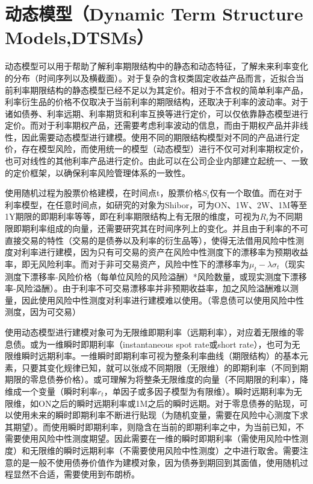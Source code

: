 \documentclass[11pt]{article}
\begin{document}
\section{动态模型（Dynamic Term Structure Models,DTSMs）}

动态模型可以用于帮助了解利率期限结构中的静态和动态特征，了解未来利率变化的分布（时间序列以及横截面）。对于复杂的含权类固定收益产品而言，近拟合当前利率期限结构的静态模型已经不足以为其定价。相对于不含权的简单利率产品，利率衍生品的价格不仅取决于当前利率的期限结构，还取决于利率的波动率。对于诸如债券、利率远期、利率期货和利率互换等进行定价，可以仅依靠静态模型进行定价。而对于利率期权产品，还需要考虑利率波动的信息，而由于期权产品并非线性，因此需要动态模型进行建模。使用不同的期限结构模型对不同的产品进行定价，存在模型风险，而使用统一的模型（动态模型）进行不仅可对利率期权定价，也可对线性的其他利率产品进行定价。由此可以在公司企业内部建立起统一、一致的定价框架，以确保利率风险管理体系的一致性。

使用随机过程为股票价格建模，在时间点t，股票价格$S_t$仅有一个取值。而在对于利率模型，在任意时间点，如研究的对象为Shibor，可为ON、1W、2W、1M等至1Y期限的即期利率等等，即在利率期限结构上有无限的维度，可视为$R_t$为不同期限即期利率组成的向量，还需要研究其在时间序列上的变化。并且由于利率的不可直接交易的特性（交易的是债券以及利率的衍生品等），使得无法借用风险中性测度对利率进行建模，因为只有可交易的资产在风险中性测度下的漂移率为预期收益率，即无风险利率。而对于非可交易资产，风险中性下的漂移率为$\mu_t-\lambda\sigma_t$（现实测度下漂移率-风险价格（每单位风险的风险溢酬）*风险数量，或现实测度下漂移率-风险溢酬）。由于利率不可交易漂移率并非预期收益率，加之风险溢酬难以测量，因此使用风险中性测度对利率进行建模难以使用。（零息债可以使用风险中性测度，因为可交易）

使用动态模型进行建模对象可为无限维即期利率（远期利率），对应着无限维的零息债。或为一维瞬时即期利率（instantaneous spot rate或short rate），也可为无限维瞬时远期利率。一维瞬时即期利率可视为整条利率曲线（期限结构）的基本元素，只要其变化规律已知，就可以张成不同期限（无限维）的即期利率（不同到期期限的零息债券价格）。或可理解为将整条无限维度的向量（不同期限的利率），降维成一个变量（瞬时利率$r_t$，单因子或多因子模型为有限维）。瞬时远期利率为无限维，如ON之后的瞬时远期利率或1M之后的瞬时远期。对于零息债券的贴现，可以使用未来的瞬时即期利率不断进行贴现（为随机变量，需要在风险中心测度下求其期望）。而使用瞬时即期利率，则隐含在当前的即期利率之中，为当前已知，不需要使用风险中性测度期望。因此需要在一维的瞬时即期利率（需使用风险中性测度）和无限维的瞬时远期利率（不需要使用风险中性测度）之中进行取舍。需要注意的是一般不使用债券价值作为建模对象，因为债券到期回到其面值，使用随机过程显然不合适，需要使用到布朗桥。
\end{document}
